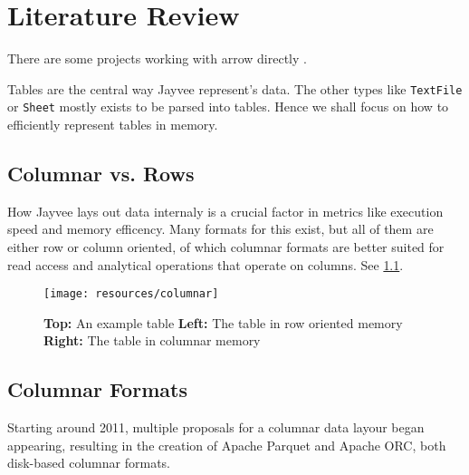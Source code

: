 \chapter{Literature Review}
\label{chapter:Literature}

There are some projects working with arrow directly
\autocite{Ahmad2020}
\autocite{Peltenburg2021}
\autocite{Grossman2022}.

Tables are the central way Jayvee represent's data.
The other types like \Verb|TextFile| or \Verb|Sheet| mostly exists to be parsed into tables.
Hence %
we shall focus on how to efficiently represent tables in memory.

\section{Columnar vs. Rows}
\label{section:column_vs_row}
How Jayvee lays out data internaly is a crucial factor in metrics like execution speed and memory efficency.
Many formats for this exist, but all of them are either row or column oriented, of which columnar formats are better suited for read access and analytical operations that operate on columns. \autocite{Floratou2019}
See \ref{fig:row_v_col}.
\begin{figure}
	\begin{center}
		\texttt{[image: resources/columnar]}
	\end{center}
	\caption{\textbf{Top:} An example table \textbf{Left:} The table in row oriented memory \textbf{Right:} The table in columnar memory}
	\label{fig:row_v_col}
\end{figure}


\section{Columnar Formats}
\label{section:columnar}
Starting around 2011, multiple proposals for a columnar data layour began appearing, resulting in the creation of Apache Parquet and Apache ORC, both disk-based columnar formats.


